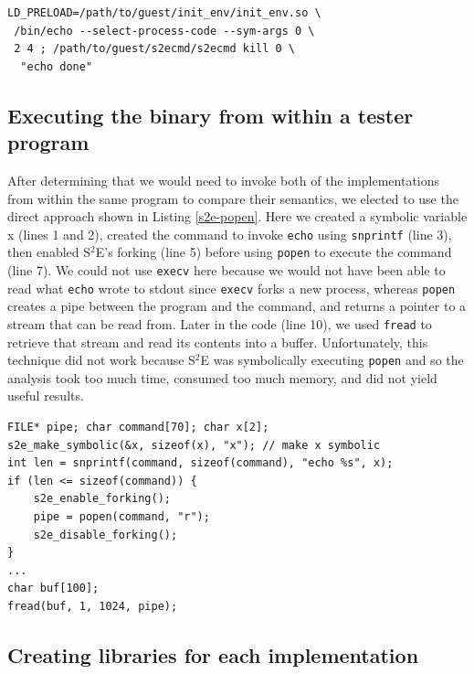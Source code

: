 \documentclass[conference]{IEEEtran}
\begin{document}
\begin{lstlisting}[style=C, label=s2e-binary, abovecaptionskip=2ex, captionpos=b, caption={Command for symbolically executing the GNU Coreutils {\tt echo} binary with S$^2$E}]
LD_PRELOAD=/path/to/guest/init_env/init_env.so \
 /bin/echo --select-process-code --sym-args 0 \
 2 4 ; /path/to/guest/s2ecmd/s2ecmd kill 0 \
  "echo done"
\end{lstlisting}

\subsection{Executing the binary from within a tester program}

After determining that we would need to invoke both of the implementations from within the same program to compare their semantics, we elected to use the direct approach shown in Listing \ref{s2e-popen}. Here we created a symbolic variable x (lines 1 and 2), created the command to invoke {\tt echo} using {\tt snprintf} (line 3), then enabled S$^2$E's forking (line 5) before using {\tt popen} to execute the command (line 7). We could not use {\tt execv} here because we would not have been able to read what {\tt echo} wrote to stdout since {\tt execv} forks a new process, whereas {\tt popen} creates a pipe between the program and the command, and returns a pointer to a stream that can be read from. Later in the code (line 10), we used {\tt fread} to retrieve that stream and read its contents into a buffer. Unfortunately, this technique did not work because S$^2$E was symbolically executing {\tt popen} and so the analysis took too much time, consumed too much memory, and did not yield useful results. \\

\begin{lstlisting}[style=C, label=s2e-popen, abovecaptionskip=2ex, captionpos=b, caption={Code to symbolically invoke the GNU Coreutils {\tt echo} binary from a tester program}]
FILE* pipe; char command[70]; char x[2];
s2e_make_symbolic(&x, sizeof(x), "x"); // make x symbolic
int len = snprintf(command, sizeof(command), "echo %s", x);
if (len <= sizeof(command)) {
    s2e_enable_forking();
    pipe = popen(command, "r");
    s2e_disable_forking();
}
...
char buf[100];
fread(buf, 1, 1024, pipe);
\end{lstlisting}

\subsection{Creating libraries for each implementation}
\end{document}
